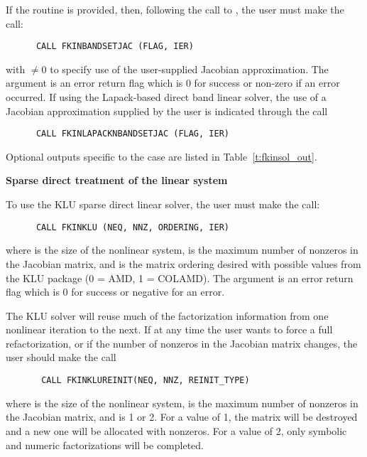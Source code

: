 \begin{Steps}
  If the  routine is provided, then, following the call to ,
  the user must make the call:
\begin{verbatim}
      CALL FKINBANDSETJAC (FLAG, IER)
\end{verbatim}
  with  $\neq 0$ to specify use of the user-supplied Jacobian approximation.
  The argument  is an error return flag which is $0$ 
  for success or non-zero if an error occurred.
  If using the Lapack-based direct band linear solver, the use of a
  Jacobian approximation supplied by the user is indicated through the call
\begin{verbatim}
      CALL FKINLAPACKNBANDSETJAC (FLAG, IER)
\end{verbatim}

  Optional outputs specific to the {\band} case are listed in Table~\ref{t:fkinsol_out}.


  {\s} {\bf Sparse direct treatment of the linear system}
  
  To use the KLU sparse direct linear solver,
  the user must make the call:
\begin{verbatim}
      CALL FKINKLU (NEQ, NNZ, ORDERING, IER)
\end{verbatim}
  where  is the size of the nonlinear system, 
   is the maximum number of nonzeros in the Jacobian matrix,
  and  is the matrix ordering desired with possible values
  from the KLU package (0 = AMD, 1 = COLAMD).
  The argument  is an error return flag which is $0$ for success 
  or negative for an error.

 The {\kinsol} KLU solver will reuse much of the factorization 
 information from one nonlinear iteration to the next.  If at any time 
 the user wants to force a full refactorization, or if the number of 
 nonzeros in the Jacobian matrix changes, the user should make the call
\begin{verbatim}
       CALL FKINKLUREINIT(NEQ, NNZ, REINIT_TYPE)
\end{verbatim}
  where  is the size of the nonlinear system, 
   is the maximum number of nonzeros in the Jacobian matrix,
  and  is 1 or 2.  For a value of 1, the matrix will be 
  destroyed and a new one will be allocated with  nonzeros.  
  For a value of 2, only symbolic and numeric factorizations 
  will be completed. 


\end{Steps}
